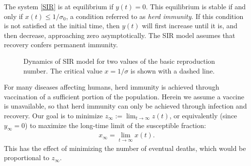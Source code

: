 \documentclass[english,12pt,letter]{article}
\newcommand{\Rnot}{\sigma_0}
\newcommand{\Sinf}{x_\infty}
\begin{document}
The system \eqref{SIR} is at equilibrium if $y(t)=0$.  This equilibrium is stable if and
only if $x(t)\le 1/\Rnot$, a condition referred to as {\em herd immunity}.  If
this condition is not satisfied at
the initial time, then $y(t)$ will first increase until it is, and then decrease,
approaching zero asymptotically.  The SIR model assumes that recovery
confers permanent immunity.

\begin{figure}
    \centering
    \caption{Dynamics of SIR model for two values of the basic reproduction number.
            The critical value $x=1/\sigma$ is shown with a dashed line.\label{fig:dynamics}}
\end{figure}

For many diseases affecting humans, herd immunity is achieved
through vaccination of a sufficient portion of the population.  Herein
we assume a vaccine is unavailable, so that herd immunity can only be achieved
through infection and recovery.
Our goal is to minimize $z_\infty := \lim_{t \to \infty} z(t)$, or equivalently
(since $y_\infty=0$)
to maximize the long-time limit of the susceptible fraction:
\begin{align}
    \Sinf = \lim_{t\to\infty} x(t).
\end{align}
This has the effect of minimizing
the number of eventual deaths, which would be proportional to $z_\infty$.
\end{document}
